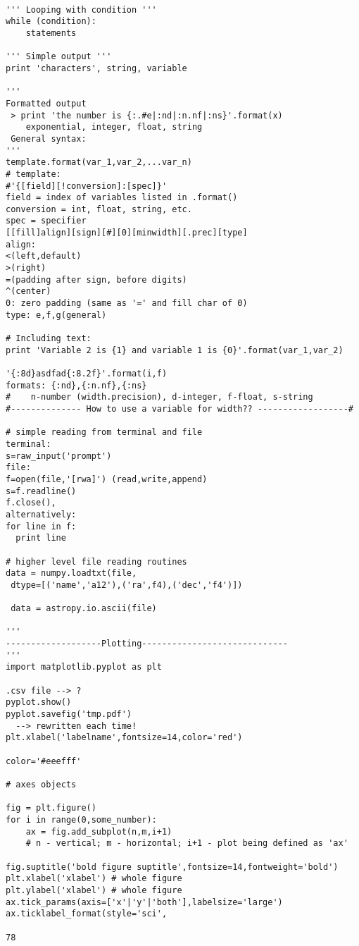 \documentclass{article}
\begin{document}
\begin{verbatim}

''' Looping with condition '''
while (condition):
    statements

''' Simple output '''
print 'characters', string, variable

'''
Formatted output
 > print 'the number is {:.#e|:nd|:n.nf|:ns}'.format(x)
    exponential, integer, float, string
 General syntax:
'''
template.format(var_1,var_2,...var_n)
# template:
#'{[field][!conversion]:[spec]}'
field = index of variables listed in .format()
conversion = int, float, string, etc.
spec = specifier
[[fill]align][sign][#][0][minwidth][.prec][type]
align:
<(left,default)
>(right)
=(padding after sign, before digits)
^(center)
0: zero padding (same as '=' and fill char of 0)
type: e,f,g(general)

# Including text:
print 'Variable 2 is {1} and variable 1 is {0}'.format(var_1,var_2)

'{:8d}asdfad{:8.2f}'.format(i,f)
formats: {:nd},{:n.nf},{:ns}
#    n-number (width.precision), d-integer, f-float, s-string
#-------------- How to use a variable for width?? ------------------#

# simple reading from terminal and file
terminal:
s=raw_input('prompt')
file:
f=open(file,'[rwa]') (read,write,append)
s=f.readline()
f.close(),
alternatively:
for line in f:
  print line

# higher level file reading routines
data = numpy.loadtxt(file,
 dtype=[('name','a12'),('ra',f4),('dec','f4')])

 data = astropy.io.ascii(file)

'''
-------------------Plotting-----------------------------
'''
import matplotlib.pyplot as plt

.csv file --> ?
pyplot.show()
pyplot.savefig('tmp.pdf')
  --> rewritten each time!
plt.xlabel('labelname',fontsize=14,color='red')

color='#eeefff'

# axes objects

fig = plt.figure()
for i in range(0,some_number):
    ax = fig.add_subplot(n,m,i+1)
    # n - vertical; m - horizontal; i+1 - plot being defined as 'ax'

fig.suptitle('bold figure suptitle',fontsize=14,fontweight='bold')
plt.xlabel('xlabel') # whole figure
plt.ylabel('xlabel') # whole figure
ax.tick_params(axis=['x'|'y'|'both'],labelsize='large')
ax.ticklabel_format(style='sci',

78
\end{verbatim}
\end{document}
